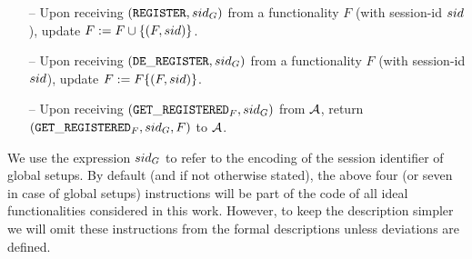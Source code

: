 \begin{itemize}
\item[--] Upon receiving $(\mathtt{REGISTER}, sid_G)$ from a functionality $F$ (with session-id $sid$), update $F:= F \cup \{(F, sid)\}$.
\item[--] Upon receiving $(\mathtt{DE\_REGISTER},sid_G)$ from a functionality $F$ (with session-id $sid$), update $F := F \{(F, sid)\}$.
\item[--] Upon receiving $(\mathtt{GET\_REGISTERED}_F, sid_G)$ from $\mathcal{A}$, return $(\mathtt{GET\_REGISTERED}_F,\allowbreak sid_G, F)$ to $\mathcal{A}$.

\end{itemize}
We use the expression $sid_G$ to refer to the encoding of the session identifier of global setups. By default (and if not otherwise stated), the above four (or seven in case of global setups) instructions will be part of the code of all ideal functionalities considered in this work. However, to keep the description simpler we will omit these instructions from the formal descriptions unless deviations are defined.
